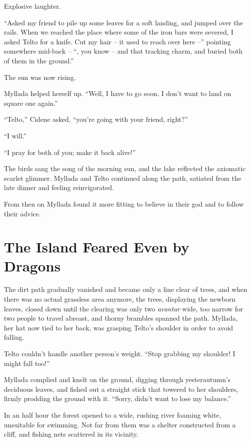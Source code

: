 Explosive laughter.

``Asked my friend to pile up some leaves for a soft landing, and jumped over the rails. When we reached the place where some of the iron bars were severed, I asked Telto for a knife. Cut my hair -- it used to reach over here --'' pointing somewhere mid-back -- ``, you know -- and that tracking charm, and buried both of them in the ground.''

\centeredstars

The sun was now rising.

Myllada helped herself up. ``Well, I have to go soon. I don't want to land on square one again.''

``Telto,'' Cidene asked, ``you're going with your friend, right?''

``I will.''

``I pray for both of you; make it back alive!''

The birds sang the song of the morning sun, and the lake reflected the axiomatic scarlet glimmer. Myllada and Telto continued along the path, satiated from the late dinner and feeling reinvigorated.

From then on Myllada found it more fitting to believe in their god and to follow their advice.

\chapter{The Island Feared Even by Dragons}

The dirt path gradually vanished and became only a line clear of trees, and when there was no actual grassless area anymore, the trees, displaying the newborn leaves, closed down until the clearing was only two \emph{avantar} wide, too narrow for two people to travel abreast, and thorny brambles spanned the path. Myllada, her hat now tied to her back, was grasping Telto's shoulder in order to avoid falling.

Telto couldn't handle another person's weight. ``Stop grabbing my shoulder! I might fall too!''

Myllada complied and knelt on the ground, digging through yesterautumn's deciduous leaves, and fished out a straight stick that towered to her shoulders, firmly prodding the ground with it. ``Sorry, didn't want to lose my balance.''

\centeredstars

In an half hour the forest opened to a wide, rushing river foaming white, unsuitable for swimming. Not far from them was a shelter constructed from a cliff, and fishing nets scattered in its vicinity.

